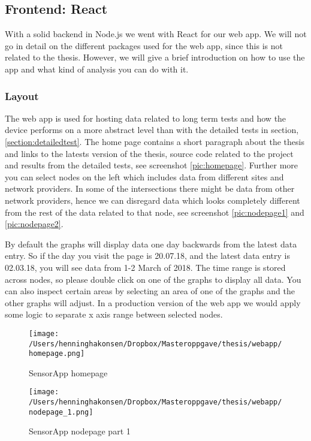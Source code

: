 \documentclass[USenglish]{ifimaster}  %
\begin{document}
\subsection{Frontend: React}
With a solid backend in Node.js we went with React for our web app. We will not go in detail on the different packages used for the web app, since this is not related to the thesis. However, we will give a brief introduction on how to use the app and what kind of analysis you can do with it.

\subsubsection{Layout}
The web app is used for hosting data related to long term tests and how the device performs on a more abstract level than with the detailed tests in section, \vref{section:detailedtest}. The home page contains a short paragraph about the thesis and links to the latests version of the thesis, source code related to the project and results from the detailed tests, see screenshot \vref{pic:homepage}. Further more you can select nodes on the left which includes data from different sites and network providers. In some of the intersections there might be data from other network providers, hence we can disregard data which looks completely different from the rest of the data related to that node, see screenshot \vref{pic:nodepage1} and \vref{pic:nodepage2}.

By default the graphs will display data one day backwards from the latest data entry. So if the day you visit the page is 20.07.18, and the latest data entry is 02.03.18, you will see data from 1-2 March of 2018. The time range is stored across nodes, so please double click on one of the graphs to display all data. You can also inspect certain areas by selecting an area of one of the graphs and the other graphs will adjust. In a production version of the web app we would apply some logic to separate x axis range between selected nodes.

\begin{figure}[H]
  \centering
  \texttt{[image: /Users/henninghakonsen/Dropbox/Masteroppgave/thesis/webapp/homepage.png]}
  \caption{SensorApp homepage}
  \label{pic:homepage}
\end{figure}

\begin{figure}[H]
  \centering
  \texttt{[image: /Users/henninghakonsen/Dropbox/Masteroppgave/thesis/webapp/nodepage\_1.png]}
  \caption{SensorApp nodepage part 1}
  \label{pic:nodepage1}
\end{figure}
\end{document}
